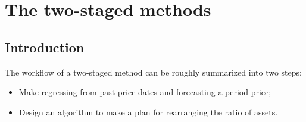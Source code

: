 \documentclass{mcmthesis}
\begin{document}






\section{The two-staged methods}

\subsection{Introduction}

The workflow of a two-staged method can be roughly summarized into two steps:

\begin{itemize}
  \item Make regressing from past price dates and forecasting a period price;
  \item Design an algorithm to make a plan for rearranging the ratio of assets.
\end{itemize}
\end{document}
